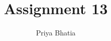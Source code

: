 \documentclass[journal,12pt,twocolumn]{IEEEtran}
\begin{document}
\makeatletter
{}
\makeatother
\let\StandardTheFigure\thefigure
\let\vec\mathbf
\renewcommand{\thefigure}{\theproblem}
\def\putbox#1#2#3{\makebox[0in][l]{\makebox[#1][l]{}\raisebox{\baselineskip}[0in][0in]{\raisebox{#2}[0in][0in]{#3}}}}
     \def\rightbox#1{\makebox[0in][r]{#1}}
     \def\centbox#1{\makebox[0in]{#1}}
     \def\topbox#1{\raisebox{-\baselineskip}[0in][0in]{#1}}
     \def\midbox#1{\raisebox{-0.5\baselineskip}[0in][0in]{#1}}
\vspace{3cm}
\title{Assignment 13}
\author{Priya Bhatia}
%
%
%
% 
%
\end{document}
